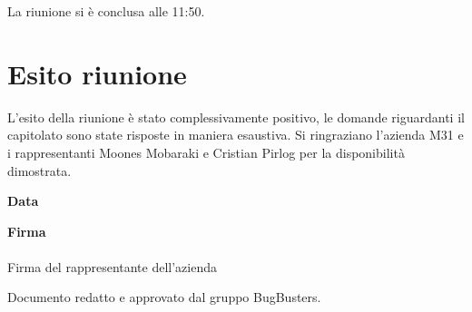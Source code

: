 \documentclass[a4paper,12pt]{article}
\begin{document}
La riunione si è conclusa alle 11:50.


\section{Esito riunione}
    L'esito della riunione è stato complessivamente positivo, le domande riguardanti il capitolato sono state risposte in maniera esaustiva. Si ringraziano l'azienda M31 e i rappresentanti Moones Mobaraki e Cristian Pirlog per la disponibilità dimostrata.
    


\vspace{1.5cm}
\noindent\textbf{\Large Data}\\[0.4cm]
\underline{\hspace{4cm}}

\vspace{1.5cm}
\noindent\textbf{\Large Firma}\\[0.8cm]
\underline{\hspace{6cm}} \\[0.2cm]
{\small Firma del rappresentante dell'azienda}

\vfill
\begin{center}
    {\small\color{darkgray} Documento redatto e approvato dal gruppo BugBusters.}
\end{center}
\end{document}
